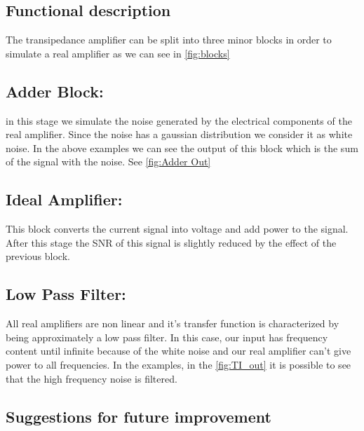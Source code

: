\subsection*{Functional description}
\begin{text}
The transipedance amplifier can be split into three minor blocks in order to simulate a real amplifier as we can see in \ref{fig:blocks}
\newline
\subsection{Adder Block:} in this stage we simulate the noise generated by the electrical components of the real amplifier. Since the noise has a gaussian distribution we consider it as white noise. In the above examples we can see the output of this block which is the sum of the signal with the noise. See \ref{fig:Adder Out}

\subsection{Ideal Amplifier:} This block converts the current signal into voltage and add power to the signal. After this stage the SNR of this signal is slightly reduced by the effect of the previous block.\newline

\subsection{Low Pass Filter:} All real amplifiers are non linear and it's transfer function is characterized by being approximately a low pass filter. In this case, our input has frequency content until infinite because of the white noise and our real amplifier can't give power to all frequencies. In the examples, in the \ref{fig:TI_out} it is possible to see that the high frequency noise is filtered.
\end{text}
\pagebreak

\subsection*{Suggestions for future improvement}
